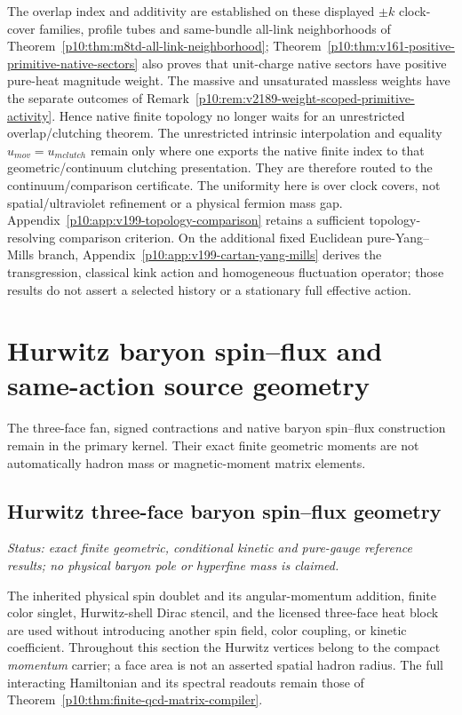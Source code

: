 \documentclass[12pt,a4paper]{article}
\begin{document}
The overlap index and additivity are established on these displayed
\(\pm k\) clock-cover families, profile tubes and same-bundle all-link
neighborhoods of Theorem~\ref{p10:thm:m8td-all-link-neighborhood};
Theorem~\ref{p10:thm:v161-positive-primitive-native-sectors} also proves that
unit-charge native sectors have positive pure-heat magnitude weight.
The massive and unsaturated massless weights have the separate outcomes
of Remark~\ref{p10:rem:v2189-weight-scoped-primitive-activity}. Hence native
finite topology no longer waits for an unrestricted overlap/clutching theorem.
The unrestricted intrinsic interpolation and equality
\(
u_{
m ov}=
u_{
m clutch}\) remain only where one exports the native
finite index to that geometric/continuum clutching presentation.  They are
therefore routed to the continuum/comparison certificate.  The uniformity
here is over clock covers, not spatial/ultraviolet refinement or a physical
fermion mass gap.  Appendix~\ref{p10:app:v199-topology-comparison} retains a
sufficient topology-resolving comparison criterion.  On the additional fixed
Euclidean pure-Yang--Mills branch,
Appendix~\ref{p10:app:v199-cartan-yang-mills} derives the transgression,
classical kink action and homogeneous fluctuation operator; those results do
not assert a selected history or a stationary full effective action.



\section{Hurwitz baryon spin--flux and same-action source geometry}
\label{p10:sec:v237-a7}
The three-face fan, signed contractions and native baryon spin--flux construction remain in the primary kernel. Their exact finite geometric moments are not automatically hadron mass or magnetic-moment matrix elements.

\subsection{Hurwitz three-face baryon spin--flux geometry}
\label{p10:sec:v2220-hurwitz-baryon-flux}
\noindent\textit{Status: exact finite geometric, conditional kinetic and
pure-gauge reference results; no physical baryon pole or hyperfine mass
is claimed.}

The inherited physical spin doublet and its angular-momentum addition,
finite color singlet, Hurwitz-shell Dirac stencil, and the licensed
three-face heat block are used without introducing another spin field,
color coupling, or kinetic coefficient.  Throughout this section the
Hurwitz vertices belong to the compact \emph{momentum} carrier; a face
area is not an asserted spatial hadron radius.  The full interacting
Hamiltonian and its spectral readouts remain those of
Theorem~\ref{p10:thm:finite-qcd-matrix-compiler}.
\end{document}
